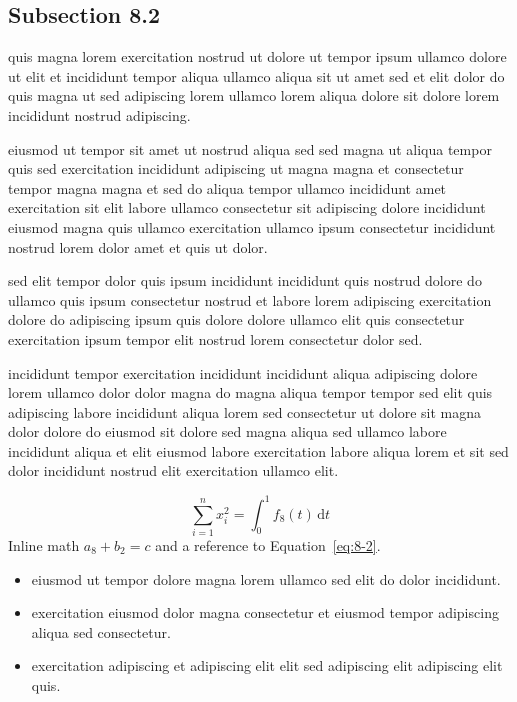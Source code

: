 \documentclass{article}
\begin{document}
\subsection{Subsection 8.2}\label{sec:8-2}
quis magna lorem exercitation nostrud ut dolore ut tempor ipsum ullamco dolore ut elit et incididunt tempor aliqua ullamco aliqua sit ut amet sed et elit dolor do quis magna ut sed adipiscing lorem ullamco lorem aliqua dolore sit dolore lorem incididunt nostrud adipiscing.

eiusmod ut tempor sit amet ut nostrud aliqua sed sed magna ut aliqua tempor quis sed exercitation incididunt adipiscing ut magna magna et consectetur tempor magna magna et sed do aliqua tempor ullamco incididunt amet exercitation sit elit labore ullamco consectetur sit adipiscing dolore incididunt eiusmod magna quis ullamco exercitation ullamco ipsum consectetur incididunt nostrud lorem dolor amet et quis ut dolor.

sed elit tempor dolor quis ipsum incididunt incididunt quis nostrud dolore do ullamco quis ipsum consectetur nostrud et labore lorem adipiscing exercitation dolore do adipiscing ipsum quis dolore dolore ullamco elit quis consectetur exercitation ipsum tempor elit nostrud lorem consectetur dolor sed.

incididunt tempor exercitation incididunt incididunt aliqua adipiscing dolore lorem ullamco dolor dolor magna do magna aliqua tempor tempor sed elit quis adipiscing labore incididunt aliqua lorem sed consectetur ut dolore sit magna dolor dolore do eiusmod sit dolore sed magna aliqua sed ullamco labore incididunt aliqua et elit eiusmod labore exercitation labore aliqua lorem et sit sed dolor incididunt nostrud elit exercitation ullamco elit.

\begin{equation}\label{eq:8-2}
  \sum_{i=1}^{n} x_i^{2} = \int_0^1 f_{8}(t)\,\mathrm{d}t
\end{equation}
Inline math $a_{8} + b_{2} = c$ and a reference to Equation~\eqref{eq:8-2}.

\begin{itemize}
  \item eiusmod ut tempor dolore magna lorem ullamco sed elit do dolor incididunt.
  \item exercitation eiusmod dolor magna consectetur et eiusmod tempor adipiscing aliqua sed consectetur.
  \item exercitation adipiscing et adipiscing elit elit sed adipiscing elit adipiscing elit quis.
\end{itemize}
\end{document}

